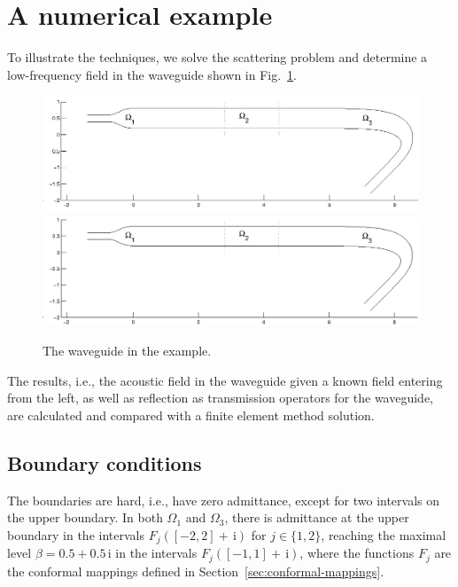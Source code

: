 \documentclass[numreferences]{kluwer}
\renewcommand{\i}{\,\mathrm{i}}
\begin{document}
\section{A numerical example}
\label{sec:numerical-example}
To illustrate the techniques, we solve the scattering problem and
determine a low-frequency field in the waveguide shown in
Fig.~\ref{fig:exwg}.
\begin{figure}[htb]
  \centering \ifpdf
  \includegraphics[width=\textwidth]{waveguide.jpg}
  \else
  \includegraphics[width=\textwidth]{waveguide.eps}
  \fi
  \caption{The waveguide in the example.}
  \label{fig:exwg}
\end{figure}
The results, i.e., the acoustic field in the waveguide given a known
field entering from the left, as well as reflection as transmission
operators for the waveguide, are calculated and compared with a finite
element method solution.

\subsection{Boundary conditions}
\label{sec:boundary-conditions}



The boundaries are hard, i.e., have zero admittance, except for two
intervals on the upper boundary. In both $\Omega_1$ and $\Omega_3$,
there is admittance at the upper boundary in the intervals
$F_j([-2,2]+\i)$ for $j\in\{1,2\}$, reaching the maximal level
$\beta=0.5+0.5\i$ in the intervals $F_j([-1,1]+\i)$, where the
functions $F_j$ are the conformal mappings defined in
Section~\ref{sec:conformal-mappings}. 
\end{document}

